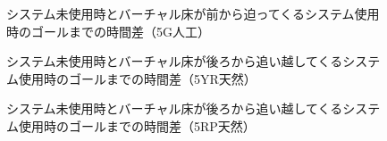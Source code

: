 \begin{figure}[H]
    \centering
    \caption{システム未使用時とバーチャル床が前から迫ってくるシステム使用時のゴールまでの時間差（5G人工）}
    \label{fig:5Gjinko}
\end{figure}

\begin{figure}[H]
    \centering
    \caption{システム未使用時とバーチャル床が後ろから追い越してくるシステム使用時のゴールまでの時間差（5YR天然）}
    \label{fig:5YRten}
\end{figure}

\begin{figure}[H]
    \centering
    \caption{システム未使用時とバーチャル床が後ろから追い越してくるシステム使用時のゴールまでの時間差（5RP天然）}
    \label{fig:5RPten}
\end{figure}

